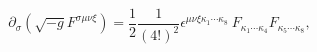 \begin{equation}
\label{fseom}
\partial_\sigma \left( \sqrt{-g} F^{\sigma \mu \nu \xi} \right)
= \frac{1}{2} \frac{1}{(4!)^2} 
\epsilon^{\mu \nu \xi \kappa_1 \cdots \kappa_8}\
F_{\kappa_1 \cdots \kappa_4} F_{\kappa_5 \cdots \kappa_8}, 
\end{equation}

